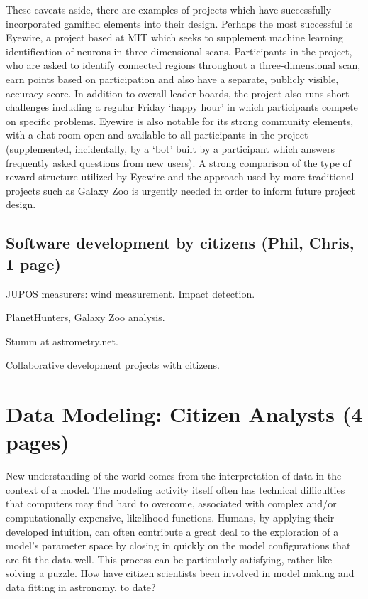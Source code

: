 \documentclass{ar2e}
\begin{document}
These caveats aside, there are examples of projects which have successfully incorporated gamified elements into their design. Perhaps the most successful is Eyewire, a project based at MIT which seeks to supplement machine learning identification of neurons in three-dimensional scans. Participants in the project, who are asked to identify connected regions throughout a three-dimensional scan, earn points based on participation and also have a separate, publicly visible, accuracy score. In addition to overall leader boards, the project also runs short challenges including a regular Friday `happy hour' in which participants compete on specific problems. Eyewire is also notable for its strong community elements, with a chat room open and available to all participants in the project (supplemented, incidentally, by a `bot' built by a participant which answers frequently asked questions from new users). A strong comparison of the type of reward structure utilized by Eyewire and the approach used by more traditional projects such as Galaxy Zoo is urgently needed in order to inform future project design. 




\subsection{Software development by citizens (\textbf{Phil}, Chris, 1 page)}
\label{sec:instr:software}

JUPOS measurers: wind measurement. 
Impact detection.

PlanetHunters, Galaxy Zoo analysis.

Stumm at astrometry.net.  

Collaborative development projects with citizens. 




\section{Data Modeling: Citizen Analysts (4 pages)}
\label{sec:model}

New understanding of the world comes from the interpretation of data in the
context of a model. The modeling activity itself often has technical
difficulties that computers may find hard to overcome, associated with complex
and/or computationally expensive, likelihood functions. Humans, by applying
their developed intuition, can often contribute a great deal to the
exploration of a model's parameter space by closing in quickly on the model
configurations that are fit the data well. This process can be particularly
satisfying, rather like solving a puzzle. How have citizen scientists been
involved in model making and data fitting in astronomy, to date?
\end{document}
